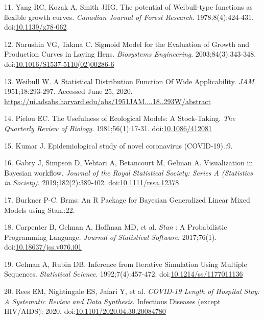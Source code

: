 \documentclass[
]{article}
\begin{document}
\leavevmode\hypertarget{ref-yang_potential_1978}{}%
11. Yang RC, Kozak A, Smith JHG. The potential of Weibull-type functions as flexible growth curves. \emph{Canadian Journal of Forest Research}. 1978;8(4):424-431. doi:\href{https://doi.org/10.1139/x78-062}{10.1139/x78-062}

\leavevmode\hypertarget{ref-narushin_sigmoid_2003}{}%
12. Narushin VG, Takma C. Sigmoid Model for the Evaluation of Growth and Production Curves in Laying Hens. \emph{Biosystems Engineering}. 2003;84(3):343-348. doi:\href{https://doi.org/10.1016/S1537-5110(02)00286-6}{10.1016/S1537-5110(02)00286-6}

\leavevmode\hypertarget{ref-weibull_statistical_1951}{}%
13. Weibull W. A Statistical Distribution Function Of Wide Applicability. \emph{JAM}. 1951;18:293-297. Accessed June 25, 2020. \url{https://ui.adsabs.harvard.edu/abs/1951JAM....18..293W/abstract}

\leavevmode\hypertarget{ref-pielou_usefulness_1981}{}%
14. Pielou EC. The Usefulness of Ecological Models: A Stock-Taking. \emph{The Quarterly Review of Biology}. 1981;56(1):17-31. doi:\href{https://doi.org/10.1086/412081}{10.1086/412081}

\leavevmode\hypertarget{ref-kumar_epidemiological_nodate}{}%
15. Kumar J. Epidemiological study of novel coronavirus (COVID-19).:9.

\leavevmode\hypertarget{ref-gabry_visualization_2019}{}%
16. Gabry J, Simpson D, Vehtari A, Betancourt M, Gelman A. Visualization in Bayesian workflow. \emph{Journal of the Royal Statistical Society: Series A (Statistics in Society)}. 2019;182(2):389-402. doi:\href{https://doi.org/10.1111/rssa.12378}{10.1111/rssa.12378}

\leavevmode\hypertarget{ref-burkner_brms_nodate}{}%
17. Burkner P-C. Brms: An R Package for Bayesian Generalized Linear Mixed Models using Stan.:22.

\leavevmode\hypertarget{ref-carpenter_stan_2017}{}%
18. Carpenter B, Gelman A, Hoffman MD, et al. \emph{Stan} : A Probabilistic Programming Language. \emph{Journal of Statistical Software}. 2017;76(1). doi:\href{https://doi.org/10.18637/jss.v076.i01}{10.18637/jss.v076.i01}

\leavevmode\hypertarget{ref-gelman_inference_1992}{}%
19. Gelman A, Rubin DB. Inference from Iterative Simulation Using Multiple Sequences. \emph{Statistical Science}. 1992;7(4):457-472. doi:\href{https://doi.org/10.1214/ss/1177011136}{10.1214/ss/1177011136}

\leavevmode\hypertarget{ref-rees_covid-19_2020}{}%
20. Rees EM, Nightingale ES, Jafari Y, et al. \emph{COVID-19 Length of Hospital Stay: A Systematic Review and Data Synthesis}. Infectious Diseases (except HIV/AIDS); 2020. doi:\href{https://doi.org/10.1101/2020.04.30.20084780}{10.1101/2020.04.30.20084780}
\end{document}
